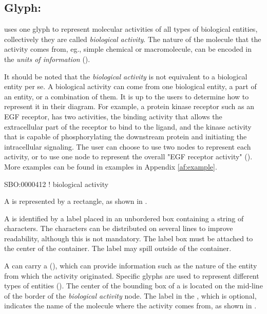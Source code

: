 \subsection{Glyph: }
\label{sec:af:biologicalActivity}

\SBGNAFLone uses one glyph to represent molecular activities of all types of biological entities, collectively they are called \emph{biological activity}. The nature of the molecule that the activity comes from, eg., simple chemical or macromolecule, can be encoded in the \emph{units of information} ().

It should be noted that the \emph{biological activity} is not equivalent to a biological entity per se.  A biological activity can come from one biological entity, a part of an entity, or a combination of  them.  It is up to the users to determine how to represent it in their diagram.  For example, a protein kinase receptor such as an EGF receptor, has two activities, the binding activity that allows the extracellular part of the receptor to bind to the ligand, and the kinase activity that is capable of phosphorylating the downstream protein and initiating the intracellular signaling.  The user can choose to use two nodes to represent each activity, or to use one node to represent the overall "EGF receptor activity" ().  More examples can be found in examples in Appendix \ref{af:example}.

\begin{glyphDescription}

\glyphSboTerm SBO:0000412 ! biological activity

\glyphContainer A  is represented by a rectangle, as shown in .

\glyphLabel A  is identified by a label placed in an unbordered box containing a string of characters.  The characters can be distributed on several lines to improve readability, although this is not mandatory.  The label box must be attached to the center of the container.  The label may spill outside of the container.

\glyphAux A  can carry a  (), which can provide information such as the nature of the entity from which the activity originated.  Specific glyphs are used to represent different types of entities ().  The center of the bounding box of a  is located on the mid-line of the border of the \emph{biological activity} node.  The label in the , which is optional, indicates the name of the molecule where the activity comes from, as shown in .

\end{glyphDescription}

